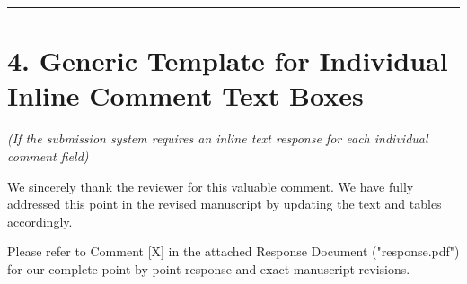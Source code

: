 \documentclass[11pt]{article}
\begin{document}
\vspace{1.5em}
\hrule
\vspace{1.5em}

\section*{4. Generic Template for Individual Inline Comment Text Boxes}
\textit{(If the submission system requires an inline text response for each individual comment field)}

\begin{tcolorbox}[colback=boxbg,colframe=primaryblue,title=\textbf{Inline Comment Response Template}]
We sincerely thank the reviewer for this valuable comment. We have fully addressed this point in the revised manuscript by updating the text and tables accordingly. 

Please refer to Comment [X] in the attached Response Document ("response.pdf") for our complete point-by-point response and exact manuscript revisions.
\end{tcolorbox}
\end{document}

